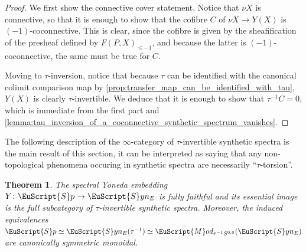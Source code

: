 \documentclass[oneside,a4paper]{amsart}
\newcommand{\euscr}[1]{\EuScript{#1}} %
\newcommand{\spectra}{\euscr{S}p} %
\newcommand{\synspectra}{\euscr{S}yn} %
\newcommand{\Mod}{\euscr{M}od} %
\theoremstyle{plain}
\newtheorem{thm}{Theorem}[section]
\theoremstyle{definition}
\theoremstyle{remark}
\begin{document}
\begin{proof}
We first show the connective cover statement. Notice that $\nu X$ is connective, so that it is enough to show that the cofibre $C$ of $\nu X \rightarrow Y(X)$ is $(-1)$-coconnective. This is clear, since the cofibre is given by the sheafification of the presheaf defined by $F(P, X)_{\leq -1}$,  and because the latter is $(-1)$-coconnective, the same must be true for $C$.

Moving to $\tau$-inversion, notice that because $\tau$ can be identified with the canonical colimit comparison map by \cref{prop:transfer_map_can_be_identified_with_tau}, $Y(X)$ is clearly $\tau$-invertible. We deduce that it is enough to show that $\tau^{-1}C = 0$, which is immediate from the first part and \cref{lemma:tau_inversion_of_a_coconnective_synthetic_spectrum_vanishes}.
\end{proof}

The following description of the $\infty$-category of $\tau$-invertible synthetic spectra is the main result of this section, it can be interpreted as saying that any non-topological phenomena occuring in synthetic spectra are necessarily ``$\tau$-torsion''. 

\begin{thm}
\label{thm:tau_invertible_synthetic_spectra_are_just_spectra}
The spectral Yoneda embedding $Y \colon \spectra \rightarrow \synspectra_{E}$ is fully faithful and its essential image is the full subcategory of $\tau$-invertible synthetic spectra. Moreover, the induced equivalences $\spectra \simeq \synspectra_{E}(\tau^{-1}) \simeq \Mod_{\tau^{-1}S^{0,0}}(\synspectra_{E})$ are canonically symmetric monoidal. 
\end{thm}
\end{document}
